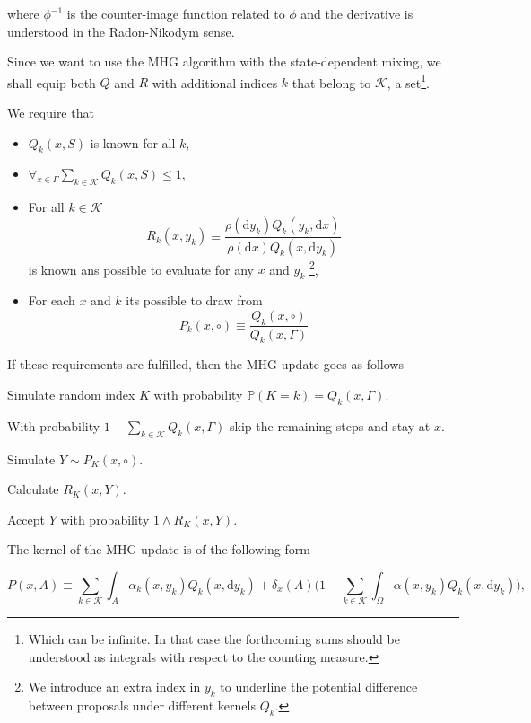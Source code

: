 where $\phi^{-1}$ is the counter-image function related to $\phi$ and the derivative is understood in the Radon-Nikodym sense. 

Since we want to use the MHG algorithm with the state-dependent mixing, we shall equip both $Q$ and $R$ with additional indices $k$ that belong to $\mathcal{K}$, a set\footnote{Which can be infinite. In that case the forthcoming sums should be understood as integrals with respect to the counting measure.}.  

We require that

\begin{itemize}
	\item $Q_k (x,S)$ is known for all $k$,
	\item $\forall_{x \in \Gamma} \underset{ k \in \mathcal{K}}{\sum} Q_k (x,S) \leq 1$,
	\item For all $k \in \mathcal{K}$ $$R_k (x,y_k) \equiv \frac{\rho(\mathrm{d } y_k)Q_k (y_k, \mathrm{d }x)}{\rho(\mathrm{d } x)Q_k (x, \mathrm{d }y_k)}$$ is known ans possible to evaluate for any $x$ and $y_k$ \footnote{We introduce an extra index in $y_k$ to underline the potential difference between proposals under different kernels $Q_k$.},
	\item For each $x$ and $k$ its possible to draw from $$P_k(x, \circ) \equiv \frac{Q_k (x, \circ)}{Q_k (x, \Gamma)}$$
\end{itemize}

If these requirements are fulfilled, then the MHG update goes as follows

\begin{algorithm}
\item Simulate random index $K$ with probability $\mathbb{P}( K = k ) = Q_k (x,\Gamma)$.
\item[] With probability $1-\underset{k \in \mathcal{K}}{\sum} Q_k (x,\Gamma)$ skip the remaining steps and stay at $x$.
\item Simulate $Y \sim P_K (x, \circ)$.
\item Calculate $R_K (x,Y)$.
\item Accept $Y$ with probability $1\wedge R_K (x,Y)$.
\end{algorithm}

The kernel of the MHG update is of the following form

	$$P(x,A) \equiv \underset{k \in \mathcal{K}}{\sum} \int_A \alpha_k (x,y_k) Q_k(x, \mathrm{d }y_k) + \delta_x (A) \Big(1 - \underset{k \in \mathcal{K}}{\sum} \int_{\Omega} \alpha(x,y_k) Q_k(x,\mathrm{d }y_k) \Big), $$

